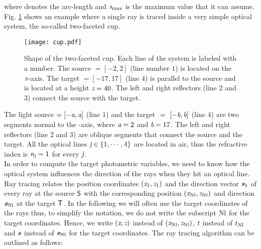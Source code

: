 where  denotes the arc-length and $\textit{s}_{\textrm{max}}$ is the maximum value that it can assume.
Fig. \ref{fig:cup} shows an example where a single ray is traced inside a very simple optical system, the so-called two-faceted cup.
\begin{figure}[h]
\label{fig:cup}
  \begin{center}
\vspace{-1.5cm}
  \texttt{[image: cup.pdf]}
  \end{center}
\vspace{-2cm}
  \caption{\footnotesize{Shape of the two-faceted cup.  Each line of the system is labeled with a number.
   The source $= [-2,2]$ (line number $1$) is located on the $\textit{x}$-axis.
   The target $= [-17, 17]$ (line $4$) is parallel to the source and is located at a height $\textit{z}= 40$.
   The left and right reflectors (line $2$ and $3$) connect the source with the target.}}
  \label{fig:cup}
\end{figure}
The light source $= [-\textit{a}, \textit{a}]$ (line $1$) and the target $~=~ [-\textit{b}, \textit{b}]$ (line $4$) are two segments normal to the -axis, where $\textit{a}=2$ and $\textit{b}=17$.
The left and right reflectors (line $2$ and $3$) are oblique segments that connect the source and the target.
All the optical lines $\textit{j} \in \{1, \cdots, 4\}$  are located in air, thus the refractive index is $\textit{n}_{\textit{j}}=1$ for every $\textit{j}$. \\ \indent
In order to compute the target photometric variables, we need to know how the optical system influences the direction of the rays when they hit an optical line.
Ray tracing relates the position coordinates
 $ (\textit{x}_1, \textit{z}_1)$ and the direction vector $\textit{\textbf{s}}_1$ of every ray at the source $\textsf{S}$ with the corresponding position $(\textit{x}_{\textrm{Nl}}, \textit{z}_{\textrm{Nl}})$ and direction $\textit{\textbf{s}}_{\textrm{Nl}}$
 at the target $\textsf{T}$. In the following we will often use the target coordinates of the rays thus, to simplify the notation, we do not write the subscript $\textrm{Nl}$ for the target coordinates. Hence, we write $(\textit{x},\textit{z})$ instead of $(\textit{x}_{\textrm{Nl}}, \textit{z}_{\textrm{Nl}})$,  $t$ instead of $t_{\textrm{Nl}}$ and $\textit{\textbf{s}}$ instead of $\textit{\textbf{s}}_{\textrm{Nl}}$ for the target coordinates.
The ray tracing algorithm can be outlined as follows:
